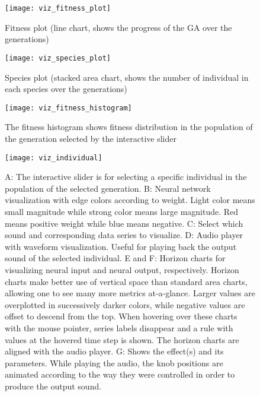 \begin{figure}[h]
    \centering
    \texttt{[image: viz\_fitness\_plot]}
    \caption{Fitness plot (line chart, shows the progress of the GA over the generations)}
    \label{fig:viz_fitness_plot}
\end{figure}

\begin{figure}[h]
    \centering
    \texttt{[image: viz\_species\_plot]}
    \caption{Species plot (stacked area chart, shows the number of individual in each species over the generations)}
    \label{fig:viz_species_plot}
\end{figure}


\begin{figure}[h]
    \centering
    \texttt{[image: viz\_fitness\_histogram]}
    \caption{The fitness histogram shows fitness distribution in the population of the generation selected by the interactive slider}
    \label{fig:viz_fitness_histogram}
\end{figure}

\begin{figure}[h]
    \centering
    \texttt{[image: viz\_individual]}
    \caption{A: The interactive slider is for selecting a specific individual in the population of the selected generation. B: Neural network visualization with edge colors according to weight. Light color means small magnitude while strong color means large magnitude. Red means positive weight while blue means negative. C: Select which sound and corresponding data series to visualize. D: Audio player with waveform visualization. Useful for playing back the output sound of the selected individual. E and F: Horizon charts for visualizing neural input and neural output, respectively. Horizon charts make better use of vertical space than standard area charts, allowing one to see many more metrics at-a-glance. Larger values are overplotted in successively darker colors, while negative values are offset to descend from the top. When hovering over these charts with the mouse pointer, series labels disappear and a rule with values at the hovered time step is shown. The horizon charts are aligned with the audio player. G: Shows the effect(s) and its parameters. While playing the audio, the knob positions are animated according to the way they were controlled in order to produce the output sound.}
    \label{fig:viz_individual}
\end{figure}


